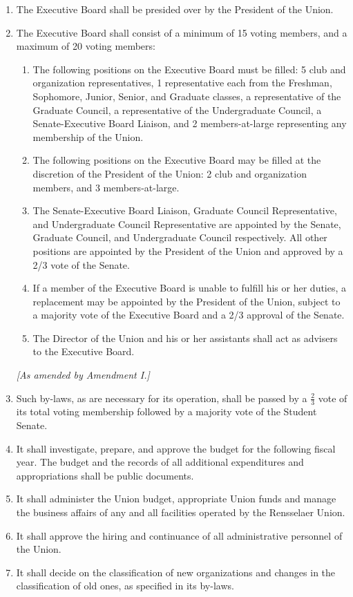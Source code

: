 \begin{enumerate}
\item The Executive Board shall be presided over by the President of the Union.
\item The Executive Board shall consist of a minimum of 15 voting members, and a maximum of 20 voting members:
\begin{enumerate}
\item The following positions on the Executive Board must be filled: 5 club and organization representatives, 1 representative each from the Freshman, Sophomore, Junior, Senior, and Graduate classes, a representative of the Graduate Council, a representative of the Undergraduate Council, a Senate-Executive Board Liaison, and 2 members-at-large representing any membership of the Union.
\item The following positions on the Executive Board may be filled at the discretion of the President of the Union: 2 club and organization members, and 3 members-at-large.
\item The Senate-Executive Board Liaison, Graduate Council Representative, and Undergraduate Council Representative are appointed by the Senate, Graduate Council, and Undergraduate Council respectively. All other positions are appointed by the President of the Union and approved by a 2/3 vote of the Senate.
\item If a member of the Executive Board is unable to fulfill his or her duties, a replacement may be appointed by the President of the Union, subject to a majority vote of the Executive Board and a 2/3 approval of the Senate.
\item The Director of the Union and his or her assistants shall act as advisers to the Executive Board.
\end{enumerate} \textit{[As amended by Amendment I.]}


\item Such by-laws, as are necessary for its operation, shall be passed by a $\frac{2}{3}$ vote of its total voting
membership followed by a majority vote of the Student Senate.
\item It shall investigate, prepare, and approve the budget for the following fiscal year. The budget
and the records of all additional expenditures and appropriations shall be public documents.
\item It shall administer the Union budget, appropriate Union funds and manage the business affairs
of any and all facilities operated by the Rensselaer Union.
\item It shall approve the hiring and continuance of all administrative personnel of the Union.
\item It shall decide on the classification of new organizations and changes in the classification of old
ones, as specified in its by-laws.
\end{enumerate}


